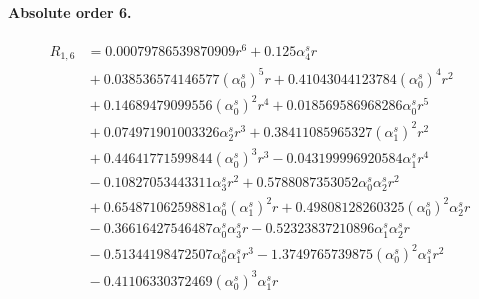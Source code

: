 \documentclass[10pt]{article}
\begin{document}
\paragraph{Absolute order 6.}
\begin{align*}
R_{1,6} &= 0.00079786539870909 r^{6} + 0.125 \alpha_{4}^s r \\
&{}  + 0.038536574146577 \left(\alpha_{0}^s\right)^{5} r + 0.41043044123784 \left(\alpha_{0}^s\right)^{4} r^{2} \\
&{}  + 0.14689479099556 \left(\alpha_{0}^s\right)^{2} r^{4} + 0.018569586968286 \alpha_{0}^s r^{5} \\
&{}  + 0.074971901003326 \alpha_{2}^s r^{3} + 0.38411085965327 \left(\alpha_{1}^s\right)^{2} r^{2} \\
&{}  + 0.44641771599844 \left(\alpha_{0}^s\right)^{3} r^{3} - 0.043199996920584 \alpha_{1}^s r^{4} \\
&{}  - 0.10827053443311 \alpha_{3}^s r^{2} + 0.5788087353052 \alpha_{0}^s \alpha_{2}^s r^{2} \\
&{}  + 0.65487106259881 \alpha_{0}^s \left(\alpha_{1}^s\right)^{2} r + 0.49808128260325 \left(\alpha_{0}^s\right)^{2} \alpha_{2}^s r \\
&{}  - 0.36616427546487 \alpha_{0}^s \alpha_{3}^s r - 0.52323837210896 \alpha_{1}^s \alpha_{2}^s r \\
&{}  - 0.51344198472507 \alpha_{0}^s \alpha_{1}^s r^{3} - 1.3749765739875 \left(\alpha_{0}^s\right)^{2} \alpha_{1}^s r^{2} \\
&{}  - 0.41106330372469 \left(\alpha_{0}^s\right)^{3} \alpha_{1}^s r
\end{align*}
\end{document}
